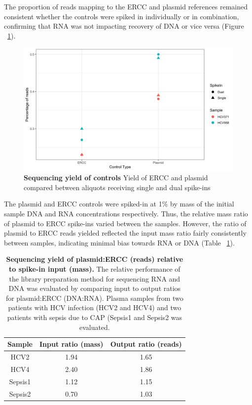 The proportion of reads mapping to the ERCC and plasmid references remained consistent whether the controls were spiked in individually or in combination, confirming that RNA was not impacting recovery of DNA or vice versa (Figure ~\ref{fig:spikein}). 

\begin{figure}[htbp]
\centering
\includegraphics[width=12cm]{./Results1/Images/spike-ins-1.png}
\caption[Sequencing of spike-in controls]{\textbf{Sequencing yield of controls} Yield of ERCC and plasmid compared between aliquots receiving single and dual spike-ins}
\label{fig:spikein}
\end{figure}

The plasmid and ERCC controls were spiked-in at 1\% by mass of the initial sample DNA and RNA concentrations respectively. Thus, the relative mass ratio of plasmid to ERCC spike-ins varied between the samples. However, the ratio of plasmid to ERCC reads yielded reflected the input mass ratio fairly consistently between samples, indicating minimal bias towards RNA or DNA (Table ~\ref{tab:ratios}).

\begin{table}[]
\begin{tabular}{|c|c|c|}
\hline
Sample   & Input ratio (mass) & Output ratio (reads) \\ \hline
HCV2   & 1.94               & 1.65                 \\ \hline
HCV4   & 2.40               & 1.86                 \\ \hline
Sepsis1  & 1.12               & 1.15                 \\ \hline
Sepsis2 & 0.70               & 1.03                 \\ \hline
\end{tabular}
\caption[Combined no fragmentation evaluation: plasmid to ERCC ratios]{\textbf{Sequencing yield of plasmid:ERCC (reads) relative to spike-in input (mass).} The relative performance of the library preparation method for sequencing RNA and DNA was evaluated by comparing input to output ratios for plasmid:ERCC (DNA:RNA). Plasma samples from two patients with HCV infection (HCV2 and HCV4) and two patients with sepsis due to CAP (Sepsis1 and Sepsis2 was evaluated.}
\label{tab:ratios}
\end{table}


